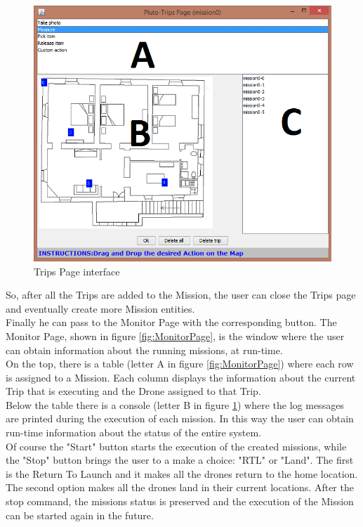 \begin{figure}[h!]
  \centering
  \includegraphics[width=\linewidth]{pictures/TripsPage.png}
  \caption{Trips Page interface}
  \label{fig:TripsPage}
\end{figure}

So, after all the Trips are added to the Mission, the user can close the Trips page and eventually create more Mission entities.
\\
Finally he can pass to the Monitor Page with the corresponding button.
The Monitor Page, shown in figure \ref{fig:MonitorPage}, is the window where the user can obtain information about the running missions, at run-time.
\\
On the top, there is a table (letter A in figure \ref{fig:MonitorPage}) where each row is assigned to a Mission.
Each column displays the information about the current Trip that is executing and the Drone assigned to that Trip.
\\
Below the table there is a console (letter B in figure \ref{fig:TripsPage}) where the log messages are printed during the execution of each mission.
In this way the user can obtain run-time information about the status of the entire system.
\\

Of course the "Start" button starts the execution of the created missions, while the "Stop" button brings the user to a make a choice: 
"RTL" or "Land".
The first is the Return To Launch and it makes all the drones return to the home location.
The second option makes all the drones land in their current locations. 
After the stop command, the missions status is preserved and the execution of the Mission can be started again in the future.
\\


